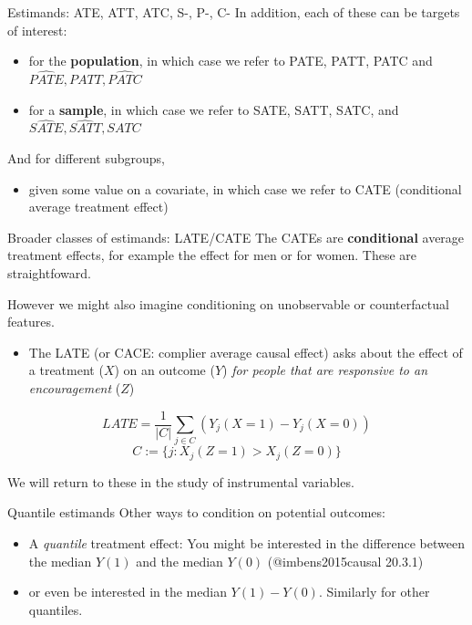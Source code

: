 \documentclass[
  11pt,
  ignorenonframetext,
]{beamer}
\providecommand{\tightlist}{%
  \setlength{\itemsep}{0pt}\setlength{\parskip}{0pt}}\usepackage{longtable,booktabs,array}
\begin{document}
\begin{frame}{Estimands: ATE, ATT, ATC, S-, P-, C-}
\protect\hypertarget{estimands-ate-att-atc-s--p--c-}{}
In addition, each of these can be targets of interest:

\begin{itemize}
\tightlist
\item
  for the \textbf{population}, in which case we refer to PATE, PATT,
  PATC and \(\widehat{PATE}, \widehat{PATT}, \widehat{PATC}\)
\item
  for a \textbf{sample}, in which case we refer to SATE, SATT, SATC, and
  \(\widehat{SATE}, \widehat{SATT}, \widehat{SATC}\)
\end{itemize}

And for different subgroups,

\begin{itemize}
\tightlist
\item
  given some value on a covariate, in which case we refer to CATE
  (conditional average treatment effect)
\end{itemize}
\end{frame}

\begin{frame}{Broader classes of estimands: LATE/CATE}
\protect\hypertarget{broader-classes-of-estimands-latecate}{}
The CATEs are \textbf{conditional} average treatment effects, for
example the effect for men or for women. These are straightfoward.

However we might also imagine conditioning on unobservable or
counterfactual features.

\begin{itemize}
\tightlist
\item
  The LATE (or CACE: complier average causal effect) asks about the
  effect of a treatment (\(X\)) on an outcome (\(Y\)) \emph{for people
  that are responsive to an encouragement} (\(Z\))
\end{itemize}

\[LATE =  \frac{1}{|C|}\sum_{j\in C}(Y_j(X=1) - Y_j(X=0))\]
\[C:=\{j:X_j(Z=1) > X_j(Z=0) \}\]

We will return to these in the study of instrumental variables.
\end{frame}

\begin{frame}{Quantile estimands}
\protect\hypertarget{quantile-estimands}{}
Other ways to condition on potential outcomes:

\begin{itemize}
\tightlist
\item
  A \emph{quantile} treatment effect: You might be interested in the
  difference between the median \(Y(1)\) and the median \(Y(0)\)
  (@imbens2015causal 20.3.1)
\item
  or even be interested in the median \(Y(1) - Y(0)\). Similarly for
  other quantiles.
\end{itemize}
\end{frame}
\end{document}
